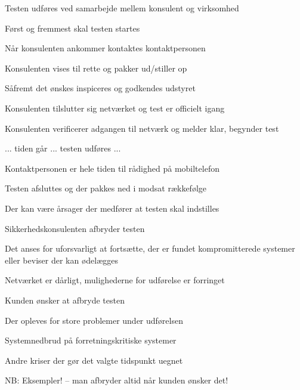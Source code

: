 \documentclass[Screen16to9,17pt]{foils}
\begin{document}
\begin{list1}
\item Testen udføres ved samarbejde mellem konsulent og virksomhed
\item Først og fremmest skal testen startes
\begin{list2}
\item Når konsulenten ankommer kontaktes kontaktpersonen
\item Konsulenten vises til rette og pakker ud/stiller op
\item Såfremt det ønskes inspiceres og godkendes udstyret
\item Konsulenten tilslutter sig netværket og test er officielt igang
\item Konsulenten verificerer adgangen til netværk og melder klar,
  begynder test
\end{list2}
\item ... tiden går ... testen udføres ...
\item Kontaktpersonen er hele tiden til rådighed på mobiltelefon
\item Testen afsluttes og der pakkes ned i modsat rækkefølge
\end{list1}



\begin{list1}
\item Der kan være årsager der medfører at testen skal indstilles
\item Sikkerhedskonsulenten afbryder testen
\begin{list2}
\item Det anses for uforsvarligt at fortsætte, der er fundet
  kompromitterede systemer eller beviser der kan ødelægges
\item Netværket er dårligt, mulighederne for udførelse er forringet
\end{list2}
\item Kunden ønsker at afbryde testen
\begin{list2}
\item Der opleves for store problemer under udførelsen
\item Systemnedbrud på forretningskritiske systemer
\item Andre kriser der gør det valgte tidspunkt uegnet
\end{list2}
\item NB: Eksempler! -- man afbryder altid når kunden ønsker det!
\end{list1}
\end{document}
